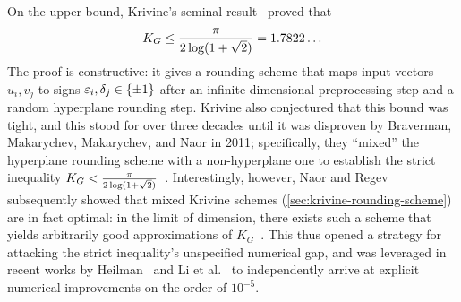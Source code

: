 





On the upper bound, Krivine's seminal result~\cite{Kri77} proved that
\begin{equation}\label{eq:krivine-bound-intro}
  K_G\le {\pi\over 2\log(1+\sqrt2)}=1.7822\ldots
\end{equation}
The proof is constructive: it gives a rounding scheme that maps input vectors $u_i,v_j$ to signs $\varepsilon_i,\delta_j\in\{\pm1\}$ after an infinite-dimensional preprocessing step and a random hyperplane rounding step.
Krivine also conjectured that this bound was tight, and this stood for over three decades until it was disproven by Braverman, Makarychev, Makarychev, and Naor in 2011; specifically, they ``mixed'' the hyperplane rounding scheme with a non-hyperplane one to establish the strict inequality $K_G < \tfrac{\pi}{2\log(1+\sqrt2)}$~\cite{braverman2011grothendieckconstantstrictlysmaller}.
Interestingly, however, Naor and Regev subsequently showed that mixed Krivine schemes (\cref{sec:krivine-rounding-scheme}) are in fact optimal: in the limit of dimension, there exists such a scheme that yields arbitrarily good approximations of $K_G$~\cite{naor2014krivine}.
This thus opened a strategy for attacking the strict inequality's unspecified numerical gap, and was leveraged in recent works by Heilman~\cite{heilman2026upperboundgrothendiecksconstant} and Li et al.~\cite{LiSahaXueChaudhuriKlivansKothariMeka2026} to independently arrive at explicit numerical improvements on the order of $10^{-5}$.



